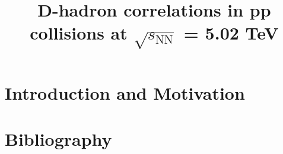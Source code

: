 \documentclass[ALICE,manyauthors]{cernphprep}
\begin{document}
\begin{titlepage}


\PHdate{\today}              

\title{D-hadron correlations  in pp collisions at $\sqrt{s_\mathrm{NN}}$ = 5.02 TeV}

%




\end{titlepage}

\linenumbers
\tableofcontents

\newpage
\section{Introduction and Motivation}


\newpage
%

\newpage
%

\newpage
%

\newpage
%
\newpage
\section{Bibliography}

\end{document}
